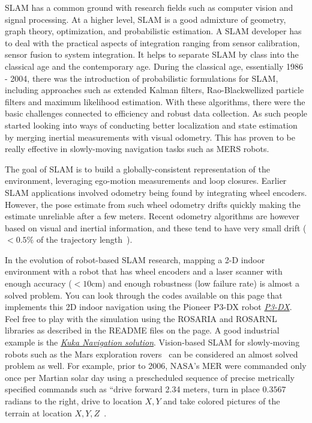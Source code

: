 SLAM has a common ground with research fields such as computer vision and signal processing. At a higher level, SLAM is a good admixture of geometry, graph theory, optimization, and probabilistic estimation. A SLAM developer has to deal with the practical aspects of integration ranging from sensor calibration, sensor fusion to system integration. It helps to separate SLAM by class into the classical age and the contemporary age. During the classical age, essentially 1986 - 2004, there was the introduction of probabilistic formulations for SLAM, including approaches such as extended Kalman filters, Rao-Blackwellized particle filters and maximum likelihood estimation. With these algorithms, there were the basic challenges connected to efficiency and robust data collection. As such people started looking into ways of conducting better localization and state estimation by merging inertial measurements with visual odometry. This has proven to be really effective in slowly-moving navigation tasks such as MERS robots. %
 
 The goal of SLAM is to build a globally-consistent representation of the environment, leveraging ego-motion measurements and loop closures. Earlier SLAM applications involved odometry being found by integrating wheel encoders. However, the pose estimate from such wheel odometry drifts quickly making the estimate unreliable after a few meters. Recent odometry algorithms are however based on visual and inertial information, and these tend to have very small drift ($< 0.5\%$ of the trajectory length~\cite{SLAMLeonard}). 
 
 In the evolution of robot-based SLAM research, mapping a 2-D indoor environment with a robot that has wheel encoders and a laser scanner with enough accuracy ($< 10$cm) and enough robustness (\eg low failure rate) is almost a solved problem. You can look through the codes available on this page that implements this 2D indoor navigation using the Pioneer P3-DX robot \href{https://github.com/SeRViCE-Lab/p3-dx}{\textit{P3-DX}}. Feel free to play with the simulation using the ROSARIA and ROSARNL libraries as described in the README files on the page. A good industrial example is the \href{https://www.kuka.com/-/media/kuka-downloads/imported/9cb8e311bfd744b4b0eab25ca883f6d3/kuka_navigation_solution_en.pdf}{\textit{Kuka Navigation solution}}. Vision-based SLAM for slowly-moving robots such as the Mars exploration  rovers~\cite{MarsVisualOdometry} can be considered an almost solved problem as well. For example, prior to 2006, NASA's MER were commanded only once per Martian solar day using a prescheduled sequence of precise metrically specified commands such as ``drive forward 2.34 meters, turn in place $0.3567$ radians to the right, drive to location $X, Y$ and take colored pictures of the terrain at location $X,Y, Z$~\cite{leger2005mars}.
 
